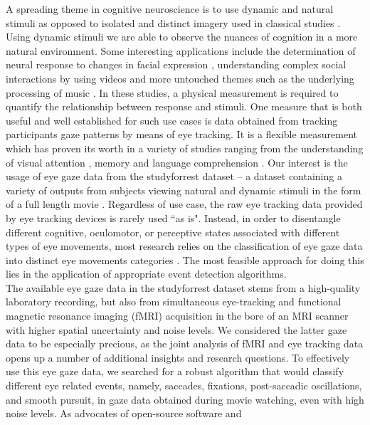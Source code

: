     A spreading theme in cognitive neuroscience is to use dynamic and natural stimuli as opposed to isolated and distinct
    imagery used in classical studies \citep{real_world}. Using dynamic stimuli we are able to observe the nuances of
    cognition in a more natural environment. Some interesting applications include the determination of neural response
    to changes in facial expression \citep{Harris2014}, understanding complex social interactions by using videos
    \citep{Tikka2012} and more untouched themes such as the underlying processing of music \citep{Toiviainen2014}.
    In these studies, a physical measurement is required to quantify the relationship between response and stimuli.
    One measure that is both useful and well established for such use cases is data obtained from tracking
    participants gaze patterns by means of eye tracking. It is a flexible measurement which has proven its worth in a
    variety of studies ranging from the understanding of visual attention \citep{HantaoLiu2011}, memory
    \citep{Hannula2010} and language comprehension \citep{Gordon2006}. Our interest is the usage of eye gaze data from
    the studyforrest dataset -- a dataset containing a variety of outputs from subjects viewing natural and
    dynamic stimuli in the form of a full length movie \citep{Hanke2016}.
    Regardless of use case, the raw eye tracking data provided by eye tracking devices is rarely used ``as
    is". Instead, in order to disentangle different cognitive, oculomotor, or perceptive states associated with
    different types of eye movements, most research relies on the classification of eye gaze data into distinct eye
    movements categories \citep{Schutz2011}. The most feasible approach for doing this lies in the application of
    appropriate event detection algorithms. \\
    The available eye gaze data in the studyforrest dataset stems from a high-quality laboratory recording, but also
    from simultaneous eye-tracking and functional magnetic resonance imaging (fMRI) acquisition in the bore of an MRI
    scanner with higher spatial uncertainty and noise levels. We considered the latter gaze data to be especially precious,
    as the joint analysis of fMRI and eye tracking data opens up a number of additional insights and research
    questions. To effectively use this eye gaze data, we searched for a robust algorithm that would classify
    different eye related events, namely, saccades, fixations, post-saccadic oscillations, and smooth pursuit, in gaze
    data obtained during movie watching, even with high noise levels. As advocates of open-source software and
